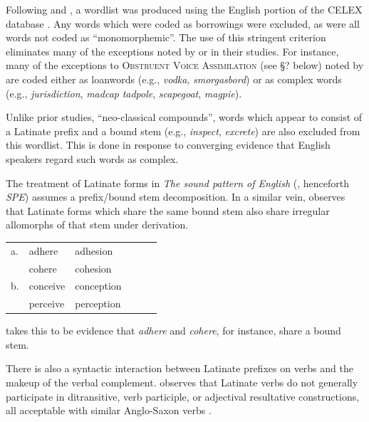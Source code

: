 Following \citet[ chap.~8]{Duanmu2009} and \citet[ chap.~3]{Hammond1999a}, 
a wordlist was produced using the English portion of the CELEX database \citep{CELEX}. Any words which were coded as borrowings were excluded, as were all words not coded as ``monomorphemic''. The use of this stringent criterion eliminates many of the exceptions noted by \citeauthor{Duanmu2009} or \citeauthor{Hammond1999a} in their studies. For instance, many of the exceptions to \textsc{Obstruent Voice Assimilation} (see \S? below) noted by \citet[74]{Hammond1999a} are coded either as loanwords (e.g., \emph{vodka}, \emph{smorgasbord}) or as complex words (e.g., \emph{jurisdiction}, \emph{madcap} \emph{tadpole}, \emph{scapegoat}, \emph{magpie}). 

Unlike prior studies, ``neo-classical compounds'', words which appear to consist of a Latinate prefix and a bound stem (e.g., \emph{inspect}, \emph{excrete}) are also excluded from this wordlist. This is done in response to converging evidence that English speakers regard such words as complex. 

The treatment of Latinate forms in \emph{The sound pattern of English} (\citealt{SPE}, henceforth \emph{SPE}) assumes a prefix/bound stem decomposition. In a similar vein, \citet[11f.]{Aronoff1976} observes that Latinate forms which share the same bound stem also share irregular allomorphs of that stem under derivation. 

\begin{example}
\begin{tabular}{l l l l l l}
a. & {adhere}   & {adhesion}   \\
   & {cohere}   & {cohesion}   \\
b. & {conceive} & {conception} \\
   & {perceive} & {perception} \\
\end{tabular}
\end{example}

\noindent
\citeauthor{Aronoff1976} takes this to be evidence that \emph{adhere} and \emph{cohere}, for instance, share a bound stem.

There is also a syntactic interaction between Latinate prefixes on verbs and the makeup of the verbal complement. \citet{Harley2009} observes that Latinate verbs do not generally participate in ditransitive, verb participle, or adjectival resultative constructions, all acceptable with similar Anglo-Saxon verbs \citep[see also][]{Gropen1989,Coppock2008}. 

